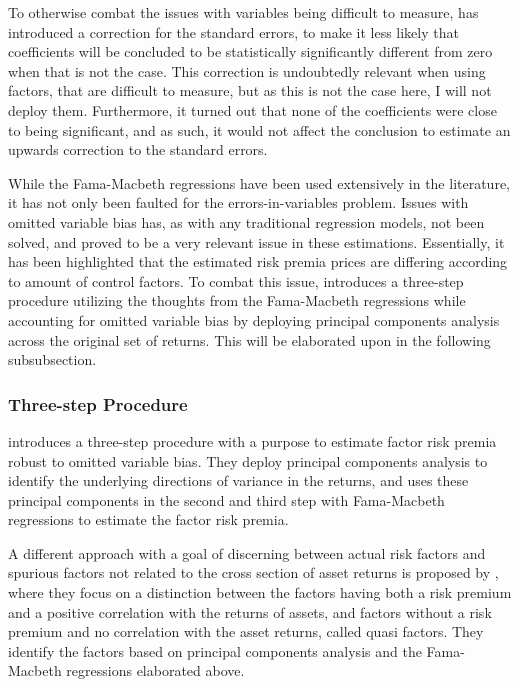To otherwise combat the issues with variables being difficult to measure, \cite{shanken1992estimation} has introduced a correction for the standard errors, to make it less likely that coefficients will be concluded to be statistically significantly different from zero when that is not the case. This correction is undoubtedly relevant when using factors, that are difficult to measure, but as this is not the case here, I will not deploy them. Furthermore, it turned out that none of the coefficients were close to being significant, and as such, it would not affect the conclusion to estimate an upwards correction to the standard errors.

While the Fama-Macbeth regressions have been used extensively in the literature, it has not only been faulted for the errors-in-variables problem. Issues with omitted variable bias has, as with any traditional regression models, not been solved, and proved to be a very relevant issue in these estimations. Essentially, it has been highlighted that the estimated risk premia prices are differing according to amount of control factors. To combat this issue, \cite{giglio2021asset} introduces a three-step procedure utilizing the thoughts from the Fama-Macbeth regressions while accounting for omitted variable bias by deploying principal components analysis across the original set of returns. This will be elaborated upon in the following subsubsection.

\subsubsection{Three-step Procedure}

\cite{giglio2021asset} introduces a three-step procedure with a purpose to estimate factor risk premia robust to omitted variable bias. They deploy principal components analysis to identify the underlying directions of variance in the returns, and uses these principal components in the second and third step with Fama-Macbeth regressions to estimate the factor risk premia. 

A different approach with a goal of discerning between actual risk factors and spurious factors not related to the cross section of asset returns is proposed by \cite{pukthuanthong2019protocol}, where they focus on a distinction between the factors having both a risk premium and a positive correlation with the returns of assets, and factors without a risk premium and no correlation with the asset returns, called quasi factors. They identify the factors based on principal components analysis and the Fama-Macbeth regressions elaborated above.

